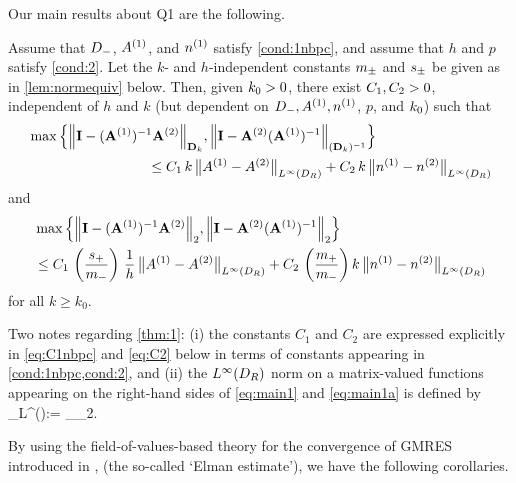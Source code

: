 Our main results about Q1 are the following.

\begin{theorem}\label{thm:1}
Assume that $D_{-}$, ${A}^{(1)}$, and ${n}^{(1)}$ satisfy \cref{cond:1nbpc}, and assume that $h$ and $p$ satisfy \cref{cond:2}. 
Let the $k$- and $h$-independent constants $m_{\pm}$ and $s_{\pm}$ be given as in \cref{lem:normequiv} below.
Then, given $k_{0}>0$, there exist $C_{1}, C_{2}>0$, independent of $h$ and $k$ (but dependent on $D_{-}, {A}^{(1)}, {n}^{(1)}$, $p$, and $k_{0}$) such that
\begin{align}\nonumber
&\max\Big\{
\NDmatk{\Imat - (\Amat^{(1)})^{-1}\Amat^{(2)}}, 
\N{\Imat -\Amat^{(2)} (\Amat^{(1)})^{-1}}_{(\Dmat_k)^{-1}}
\Big\}\\
&\hspace{3cm} 
\leq C_1 \,k \,
\big\|\Aso-\Ast\big\|_{L^\infty(\DR)} + C_2 \, k \, \big\|\nso-\nst\big\|_{L^\infty(\DR)}
\label{eq:main1}
\end{align}
and 
\begin{align}\nonumber
&\max\Big\{
\N{\Imat - (\Amat^{(1)})^{-1}\Amat^{(2)}}_2, 
\N{\Imat -\Amat^{(2)} (\Amat^{(1)})^{-1}}_2
\Big\}\\
&\hspace{0cm} 
\leq C_1 \,\left(\frac{s_+}{m_-}\right) \,\frac{1}{h} \,
\big\|\Aso-\Ast\big\|_{L^\infty(\DR)} + C_2 \, \left(\frac{m_+}{m_-} \right)k \, \big\|\nso-\nst\big\|_{L^\infty(\DR)}
\label{eq:main1a}
\end{align}
for all $k\geq k_0$. 
\end{theorem}

Two notes regarding \cref{thm:1}: (i) the constants $C_1$ and $C_2$ are expressed explicitly in \cref{eq:C1nbpc} and \cref{eq:C2} below in terms of constants appearing in \cref{cond:1nbpc,cond:2}, and (ii) the $L^\infty(D_{R})$ norm on a matrix-valued functions appearing on the right-hand sides of \cref{eq:main1} and \cref{eq:main1a} is defined by
\beqs
{}_{L^\infty(\DR)}:= \esssup_{\bx\in\DR}_2.
\eeqs

By using the field-of-values-based theory for the convergence of GMRES introduced in \cite{El:82}, \cite{EiElSc:83} (the so-called `Elman estimate'), we have the following corollaries.

